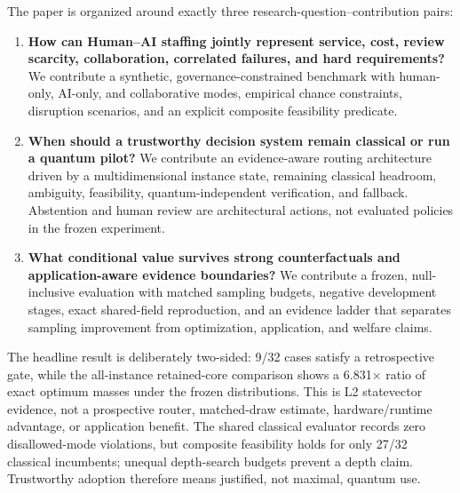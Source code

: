 The paper is organized around exactly three research-question--contribution pairs:
\begin{enumerate}[leftmargin=*,label=\textbf{RQ\arabic*.},itemsep=1pt,topsep=3pt]
\item \textbf{How can Human--AI staffing jointly represent service, cost, review scarcity, collaboration, correlated failures, and hard requirements?} We contribute a synthetic, governance-constrained benchmark with human-only, AI-only, and collaborative modes, empirical chance constraints, disruption scenarios, and an explicit composite feasibility predicate.
\item \textbf{When should a trustworthy decision system remain classical or run a quantum pilot?} We contribute an evidence-aware routing architecture driven by a multidimensional instance state, remaining classical headroom, ambiguity, feasibility, quantum-independent verification, and fallback. Abstention and human review are architectural actions, not evaluated policies in the frozen experiment.
\item \textbf{What conditional value survives strong counterfactuals and application-aware evidence boundaries?} We contribute a frozen, null-inclusive evaluation with matched sampling budgets, negative development stages, exact shared-field reproduction, and an evidence ladder that separates sampling improvement from optimization, application, and welfare claims.
\end{enumerate}

The headline result is deliberately two-sided: 9/32 cases satisfy a retrospective gate, while the all-instance retained-core comparison shows a 6.831$\times$ ratio of exact optimum masses under the frozen distributions. This is L2 statevector evidence, not a prospective router, matched-draw estimate, hardware/runtime advantage, or application benefit. The shared classical evaluator records zero disallowed-mode violations, but composite feasibility holds for only 27/32 classical incumbents; unequal depth-search budgets prevent a depth claim. Trustworthy adoption therefore means justified, not maximal, quantum use.
